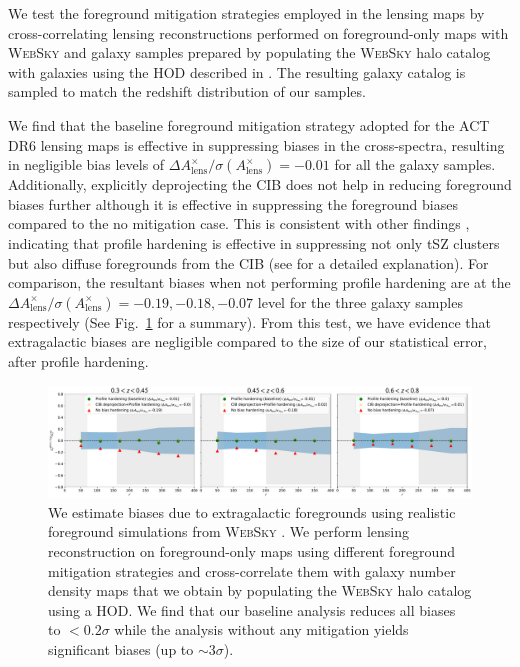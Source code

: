 \documentclass[twocolumn]{aastex631}
\newcommand{\Ax}{A^{\times}_{\mathrm{lens}}}
\begin{document}
{We test the foreground mitigation strategies employed in the lensing maps by cross-correlating lensing reconstructions performed on foreground-only maps with \textsc{WebSky} and galaxy samples prepared by populating the \textsc{WebSky} halo catalog with galaxies using the HOD described in \cite{hang2021}. The resulting galaxy catalog is sampled to match the redshift distribution of our samples. 

We find that the baseline foreground mitigation strategy adopted for the ACT DR6 lensing maps is effective in suppressing biases in the cross-spectra, resulting in negligible bias levels of $\Delta{\Ax}/{\sigma({\Ax})}=-0.01$ for all the galaxy samples. Additionally, explicitly deprojecting the CIB does not help in reducing foreground biases further although it is effective in suppressing the foreground biases compared to the no mitigation case. This is consistent with other findings  \citep{maccrann2023atacama,farren2023atacama,Kim2024}, indicating that profile hardening is effective in suppressing not only tSZ clusters but also diffuse foregrounds from the CIB (see \cite{PhysRevD.107.023504} for a detailed explanation). For comparison, the resultant biases when not performing profile hardening are at the $\Delta{\Ax}/{\sigma({\Ax})}=-0.19,-0.18,-0.07$ level for the three galaxy samples respectively (See Fig.~\ref{fig:websky_biases} for a summary). From this test, we have evidence that extragalactic biases are negligible compared to the size of our statistical error, after profile hardening.



\begin{figure}
    \centering
    \includegraphics[width=\linewidth]{figures/websky.pdf}
    \caption{We estimate biases due to extragalactic foregrounds using realistic foreground simulations from \textsc{WebSky} \citep{ Stein_2020}. We perform lensing reconstruction on foreground-only maps using different foreground mitigation strategies and cross-correlate them with galaxy number density maps that we obtain by populating the \textsc{WebSky} halo catalog using a HOD. We find that our baseline analysis reduces all biases to $<0.2\sigma$ while the analysis without any mitigation yields significant biases (up to $\sim 3\sigma$).}
    \label{fig:websky_biases}
\end{figure}


}
\end{document}
